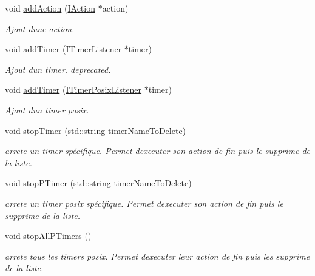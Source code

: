 \begin{DoxyCompactItemize}
void \hyperlink{classActionManagerTimer_ad44aa7bf3d361e60d3ed764d833eafc5}{add\+Action} (\hyperlink{classIAction}{I\+Action} $\ast$action)
\begin{DoxyCompactList}\small\item\em Ajout d\textquotesingle{}une action. \end{DoxyCompactList}\item 
void \hyperlink{classActionManagerTimer_a37abad611ac11d81f2ebcb8d9d5766f8}{add\+Timer} (\hyperlink{classITimerListener}{I\+Timer\+Listener} $\ast$timer)
\begin{DoxyCompactList}\small\item\em Ajout d\textquotesingle{}un timer. deprecated. \end{DoxyCompactList}\item 
void \hyperlink{classActionManagerTimer_a4d893b58bd1d02a9a610eabea05bec1a}{add\+Timer} (\hyperlink{classITimerPosixListener}{I\+Timer\+Posix\+Listener} $\ast$timer)
\begin{DoxyCompactList}\small\item\em Ajout d\textquotesingle{}un timer posix. \end{DoxyCompactList}\item 
void \hyperlink{classActionManagerTimer_a3043c43e2b56ed05633d68bf5c530c1f}{stop\+Timer} (std\+::string timer\+Name\+To\+Delete)
\begin{DoxyCompactList}\small\item\em arrete un timer spécifique. Permet d\textquotesingle{}executer son action de fin puis le supprime de la liste. \end{DoxyCompactList}\item 
void \hyperlink{classActionManagerTimer_a77bc841824ad1722363dd29a351a74cf}{stop\+P\+Timer} (std\+::string timer\+Name\+To\+Delete)
\begin{DoxyCompactList}\small\item\em arrete un timer posix spécifique. Permet d\textquotesingle{}executer son action de fin puis le supprime de la liste. \end{DoxyCompactList}\item 
\mbox{\label{classActionManagerTimer_aea93da8bac8e622881a125ee7506a7ca}} 
void \hyperlink{classActionManagerTimer_aea93da8bac8e622881a125ee7506a7ca}{stop\+All\+P\+Timers} ()
\begin{DoxyCompactList}\small\item\em arrete tous les timers posix. Permet d\textquotesingle{}executer leur action de fin puis les supprime de la liste. \end{DoxyCompactList}\item 

\end{DoxyCompactItemize}
